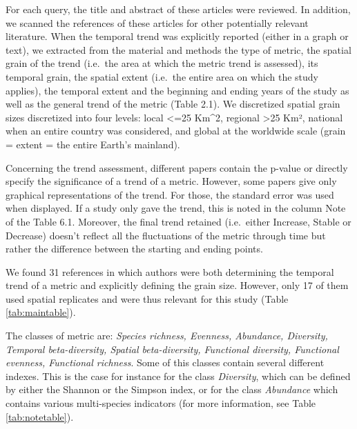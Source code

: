 \documentclass[
  12pt,
  oneside]{report}
\begin{document}
For each query, the title and abstract of these articles were reviewed. In addition, we scanned the references of these articles for other potentially relevant literature. When the temporal trend was explicitly reported (either in a graph or text), we extracted from the material and methods the type of metric, the spatial grain of the trend (i.e.~the area at which the metric trend is assessed), its temporal grain, the spatial extent (i.e.~the entire area on which the study applies), the temporal extent and the beginning and ending years of the study as well as the general trend of the metric (Table 2.1). We discretized spatial grain sizes discretized into four levels: local \textless=25 Km\^{}2, regional \textgreater25 Km², national when an entire country was considered, and global at the worldwide scale (grain = extent = the entire Earth's mainland).

Concerning the trend assessment, different papers contain the p-value or directly specify the significance of a trend of a metric. However, some papers give only graphical representations of the trend. For those, the standard error was used when displayed. If a study only gave the trend, this is noted in the column Note of the Table 6.1. Moreover, the final trend retained (i.e.~either Increase, Stable or Decrease) doesn't reflect all the fluctuations of the metric through time but rather the difference between the starting and ending points.

We found 31 references in which authors were both determining the temporal trend of a metric and explicitly defining the grain size. However, only 17 of them used spatial replicates and were thus relevant for this study (Table \ref{tab:maintable}).

The classes of metric are: \emph{Species richness, Evenness, Abundance, Diversity, Temporal beta-diversity, Spatial beta-diversity, Functional diversity, Functional evenness, Functional richness}. Some of this classes contain several different indexes. This is the case for instance for the class \emph{Diversity}, which can be defined by either the Shannon or the Simpson index, or for the class \emph{Abundance} which contains various multi-species indicators (for more information, see Table \ref{tab:notetable}).
\end{document}
